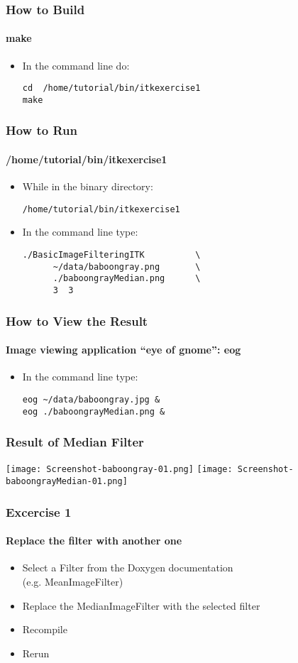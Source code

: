 \begin{frame}[fragile]
\frametitle{How to Build}
\framesubtitle{make}
\begin{itemize}
\item In the command line do:
\begin{verbatim}
cd  /home/tutorial/bin/itkexercise1
make
\end{verbatim}
\end{itemize}
\end{frame}

\begin{frame}[fragile]
\frametitle{How to Run}
\framesubtitle{/home/tutorial/bin/itkexercise1}
\begin{itemize}
\item While in the binary directory:
\begin{verbatim}
/home/tutorial/bin/itkexercise1
\end{verbatim}
\item In the command line type:
\begin{verbatim}
./BasicImageFilteringITK          \
      ~/data/baboongray.png       \
      ./baboongrayMedian.png      \
      3  3
\end{verbatim}
\end{itemize}
\end{frame}

\begin{frame}[fragile]
\frametitle{How to View the Result}
\framesubtitle{Image viewing application ``eye of gnome'': eog}
\begin{itemize}
\item In the command line type:
\begin{verbatim}
eog ~/data/baboongray.jpg &
eog ./baboongrayMedian.png &
\end{verbatim}
\end{itemize}
\end{frame}

\begin{frame}[fragile]
\frametitle{Result of Median Filter}
\begin{center}
  \texttt{[image: Screenshot-baboongray-01.png]}
  \texttt{[image: Screenshot-baboongrayMedian-01.png]}
\end{center}
\end{frame}

\begin{frame}[fragile]
\frametitle{Excercise 1}
\framesubtitle{Replace the filter with another one}
\begin{itemize}
\item Select a Filter from the Doxygen documentation\\
(e.g. MeanImageFilter)
\item Replace the MedianImageFilter with the selected filter
\item Recompile
\item Rerun
\end{itemize}
\end{frame}

